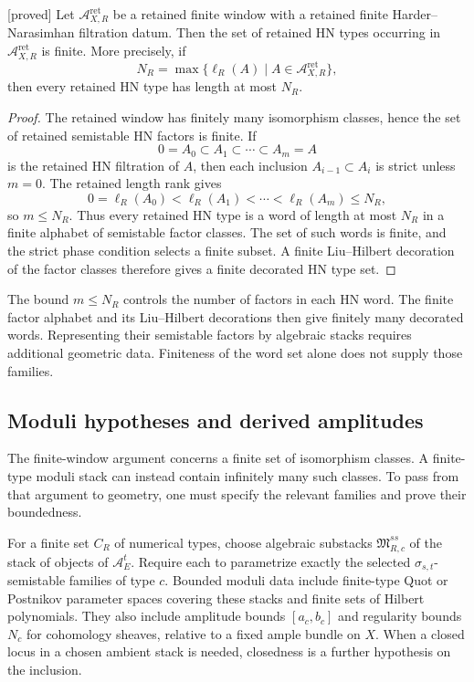 \begin{proposition}
\label{prop:retained-hn-type-bounded}
\textnormal{[proved]}
Let \(\mathcal A_{X,R}^{\mathrm{ret}}\) be a retained finite window
with a retained finite Harder--Narasimhan filtration datum.  Then the
set of retained HN types occurring in
\(\mathcal A_{X,R}^{\mathrm{ret}}\) is finite.  More precisely, if
\[
N_R=\max\{\ell_R(A)\mid A\in
\mathcal A_{X,R}^{\mathrm{ret}}\},
\]
then every retained HN type has length at most \(N_R\).
\end{proposition}

\begin{proof}
The retained window has finitely many isomorphism classes, hence the
set of retained semistable HN factors is finite.  If
\[
0=A_0\subset A_1\subset\cdots\subset A_m=A
\]
is the retained HN filtration of \(A\), then each inclusion
\(A_{i-1}\subset A_i\) is strict unless \(m=0\).  The retained length
rank gives
\[
0=\ell_R(A_0)<\ell_R(A_1)<\cdots<\ell_R(A_m)\le N_R,
\]
so \(m\le N_R\).  Thus every retained HN type is a word of length at
most \(N_R\) in a finite alphabet of semistable factor classes.  The
set of such words is finite, and the strict phase condition selects a
finite subset.  A finite Liu--Hilbert decoration of the factor classes
therefore gives a finite decorated HN type set.
\end{proof}

The bound \(m\le N_R\) controls the number of factors in each HN
word.  The finite factor alphabet and its Liu--Hilbert decorations
then give finitely many decorated words.  Representing their
semistable factors by algebraic stacks requires additional geometric data.  Finiteness of the word
set alone does not supply those families.

\subsection{Moduli hypotheses and derived amplitudes}

The finite-window argument concerns a finite set of isomorphism
classes.  A finite-type moduli stack can instead contain infinitely
many such classes.  To pass from that argument to geometry, one must
specify the relevant families and prove their boundedness.

\begin{definition}
\label{def:retained-finite-type-semistable-substack-datum}
\label{def:retained-finite-class-bound-datum}
For a finite set $C_R$ of numerical types, choose algebraic substacks
$\mathfrak M^{ss}_{R,c}$ of the stack of objects of
$\mathcal A_E^t$.  Require each to parametrize exactly the selected
$\sigma_{s,t}$-semistable families of type $c$.  Bounded moduli data include finite-type Quot or Postnikov parameter
spaces covering these stacks and finite sets of Hilbert polynomials.
They also include amplitude bounds $[a_c,b_c]$ and regularity bounds
$N_c$ for cohomology sheaves, relative to a fixed ample bundle on $X$.
When a closed locus in a chosen ambient stack is needed, closedness
is a further hypothesis on the inclusion.
\end{definition}


